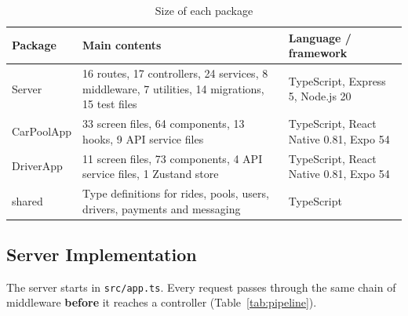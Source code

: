 \begin{table}[H]
  \centering
  \small
  \caption{Size of each package}
  \label{tab:package-size}
  \begin{tabularx}{\textwidth}{@{}p{2.4cm}Lp{4.2cm}@{}}
    \toprule
    \textbf{Package} & \textbf{Main contents} & \textbf{Language / framework} \\
    \midrule
    Server     & 16 routes, 17 controllers, 24 services, 8 middleware, 7 utilities, 14 migrations, 15 test files & TypeScript, Express 5, Node.js 20 \\
    CarPoolApp & 33 screen files, 64 components, 13 hooks, 9 API service files & TypeScript, React Native 0.81, Expo 54 \\
    DriverApp  & 11 screen files, 73 components, 4 API service files, 1 Zustand store & TypeScript, React Native 0.81, Expo 54 \\
    shared     & Type definitions for rides, pools, users, drivers, payments and messaging & TypeScript \\
    \bottomrule
  \end{tabularx}
\end{table}

\subsection{Server Implementation}
\label{subsec:server-impl}

The server starts in \texttt{src/app.ts}. Every request passes through the same
chain of middleware \textbf{before} it reaches a controller
(Table~\ref{tab:pipeline}).

